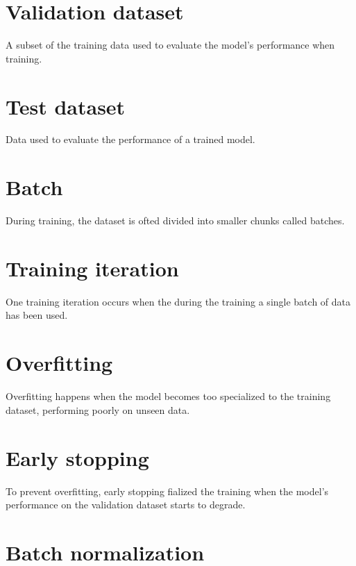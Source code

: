\section{Validation dataset}
A subset of the training data used to evaluate the model's performance
when training.

\section{Test dataset}
Data used to evaluate the performance of a trained model.

\section{Batch}
During training, the dataset is ofted divided into smaller chunks
called batches.

\section{Training iteration}
One training iteration occurs when the during the training a single
batch of data has been used.

\section{Overfitting}
Overfitting happens when the model becomes too specialized to the
training dataset, performing poorly on unseen data.

\section{Early stopping}
To prevent overfitting, early stopping fialized the training when the
model's performance on the validation dataset starts to degrade.

\section{Batch normalization}
